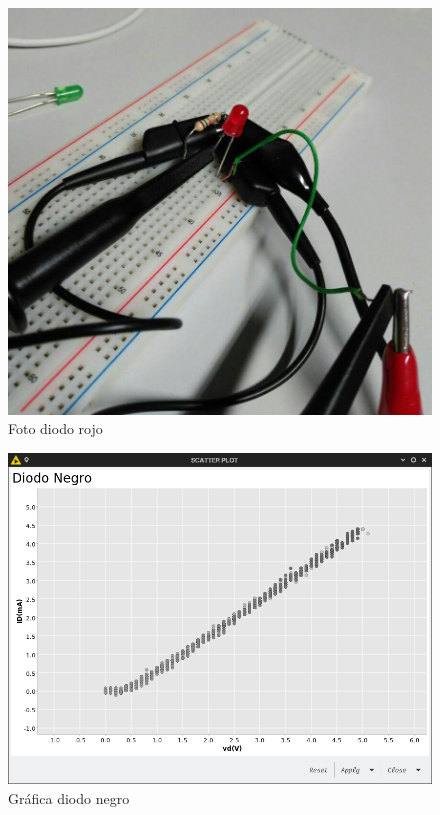 \documentclass[paper=a4, fontsize=11pt]{scrartcl} %
\numberwithin{equation}{section} %
\numberwithin{figure}{section} %
\numberwithin{table}{section} %
\begin{document}
\begin{itemize}
	\begin{figure}[H]
		\centering
		\includegraphics[scale=0.4]{image/foto-diodo-rojo}
		\caption{Foto diodo rojo}
		\label{fig:foto-diodo-rojo}
	\end{figure}
	
	\begin{figure}[H]
		\centering
		\includegraphics[scale=0.4]{image/diodo-negro}
		\caption{Gráfica diodo negro}
		\label{fig:grafica-diodo-negro}
	\end{figure}
	

\end{itemize}
\end{document}
